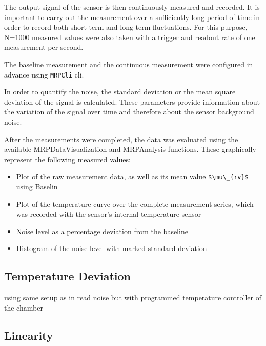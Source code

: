 The output signal of the sensor is then continuously measured and
recorded. It is important to carry out the measurement over a
sufficiently long period of time in order to record both short-term and
long-term fluctuations. For this purpose, N=1000 measured values were
also taken with a trigger and readout rate of one measurement per
second.

The baseline measurement and the continuous measurement were configured
in advance using \passthrough{\lstinline!MRPCli!} \gls{cli}.

In order to quantify the noise, the standard deviation or the mean
square deviation of the signal is calculated. These parameters provide
information about the variation of the signal over time and therefore
about the sensor background noise.

After the measurements were completed, the data was evaluated using the
available MRPDataVisualization and MRPAnalysis functions. These
graphically represent the following measured values:

\begin{itemize}
\tightlist
\item
  Plot of the raw measurement data, as well as its mean value
  \passthrough{\lstinline!$\\mu\_\{rv\}$!} using Baselin
\item
  Plot of the temperature curve over the complete measurement series,
  which was recorded with the sensor's internal temperature sensor
\item
  Noise level as a percentage deviation from the baseline
\item
  Histogram of the noise level with marked standard deviation
\end{itemize}

\hypertarget{temperature-deviation}{%
\subsection{Temperature Deviation}\label{temperature-deviation}}

using same setup as in read noise but with programmed temperature
controller of the chamber

\hypertarget{linearity}{%
\subsection{Linearity}\label{linearity}}

